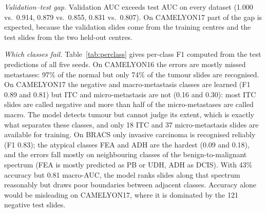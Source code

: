 \documentclass[conference]{IEEEtran}
\begin{document}
\emph{Validation--test gap.} Validation AUC exceeds test AUC on every dataset (1.000 vs.\ 0.914, 0.879 vs.\ 0.855, 0.831 vs.\ 0.807). On CAMELYON17 part of the gap is expected, because the validation slides come from the training centres and the test slides from the two held-out centres.

\emph{Which classes fail.} Table~\ref{tab:perclass} gives per-class F1 computed from the test predictions of all five seeds. On CAMELYON16 the errors are mostly missed metastases: 97\% of the normal but only 74\% of the tumour slides are recognised. On CAMELYON17 the negative and macro-metastasis classes are learned (F1 0.89 and 0.81) but ITC and micro-metastasis are not (0.16 and 0.30): most ITC slides are called negative and more than half of the micro-metastases are called macro. The model detects tumour but cannot judge its extent, which is exactly what separates these classes, and only 18 ITC and 37 micro-metastasis slides are available for training. On BRACS only invasive carcinoma is recognised reliably (F1 0.83); the atypical classes FEA and ADH are the hardest (0.09 and 0.18), and the errors fall mostly on neighbouring classes of the benign-to-malignant spectrum (FEA is mostly predicted as PB or UDH, ADH as DCIS). With 43\% accuracy but 0.81 macro-AUC, the model ranks slides along that spectrum reasonably but draws poor boundaries between adjacent classes. Accuracy alone would be misleading on CAMELYON17, where it is dominated by the 121 negative test slides.

\begin{table}[t]
\centering
\caption{Per-class test F1, computed from the pooled test predictions of the five seeds. Classes: CAMELYON16 normal (N) / tumour (T); CAMELYON17 negative / ITC / micro- / macro-metastasis; BRACS N / PB / UDH / FEA / ADH / DCIS / IC.}
\label{tab:perclass}
\setlength{\tabcolsep}{3.5pt}
\end{table}
\end{document}
